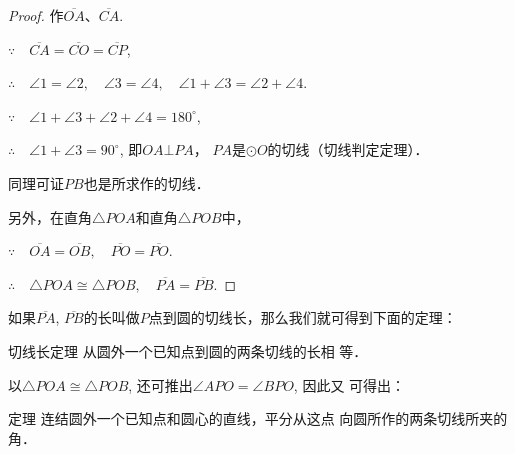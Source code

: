 \begin{figure}[htp]
    \centering
{}
    \caption{}
\end{figure}



\begin{proof}
  作$\overline{OA}$、$\overline{CA}$.

$\because\quad  \overline{CA}=\overline{CO}=\overline{CP}$,

$\therefore\quad \angle 1=\angle 2,\quad \angle 3=\angle 4,\quad \angle 1+\angle 3=\angle 2+\angle 4$.

$\because\quad \angle 1+\angle 3+\angle 2+\angle 4=180^{\circ}$,

$\therefore\quad \angle 1+\angle 3=90^{\circ}$, 即$OA\bot PA$，
$PA$是$\odot O$的切线（切线判定定理）．

同理可证$PB$也是所求作的切线．

另外，在直角$\triangle POA$和直角$\triangle POB$中，

$\because\quad \overline{OA}=\overline{OB},\quad \overline{PO}=\overline{PO}$.

$\therefore\quad \triangle POA\cong \triangle POB,\quad 
\overline{PA}=\overline{PB}$.  
\end{proof}

如果$\overline{PA}$, $\overline{PB}$的长叫做$P$点到圆的切线长，那么我们就可得到下面的定理：

\begin{blk}
    {切线长定理}
从圆外一个已知点到圆的两条切线的长相
等．
\end{blk}

以$\triangle POA\cong \triangle POB$, 还可推出$\angle APO=\angle BPO$, 因此又
可得出：

\begin{blk}
    {定理} 连结圆外一个已知点和圆心的直线，平分从这点
向圆所作的两条切线所夹的角．
\end{blk}

